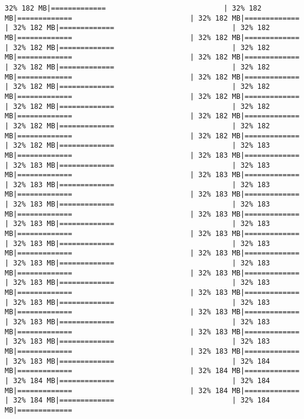 \documentclass[
]{article}
\begin{document}
\begin{verbatim}
32% 182 MB|=============                            | 32% 182 MB|=============                            | 32% 182 MB|=============                            | 32% 182 MB|=============                            | 32% 182 MB|=============                            | 32% 182 MB|=============                            | 32% 182 MB|=============                            | 32% 182 MB|=============                            | 32% 182 MB|=============                            | 32% 182 MB|=============                            | 32% 182 MB|=============                            | 32% 182 MB|=============                            | 32% 182 MB|=============                            | 32% 182 MB|=============                            | 32% 182 MB|=============                            | 32% 182 MB|=============                            | 32% 182 MB|=============                            | 32% 182 MB|=============                            | 32% 182 MB|=============                            | 32% 182 MB|=============                            | 32% 182 MB|=============                            | 32% 182 MB|=============                            | 32% 183 MB|=============                            | 32% 183 MB|=============                            | 32% 183 MB|=============                            | 32% 183 MB|=============                            | 32% 183 MB|=============                            | 32% 183 MB|=============                            | 32% 183 MB|=============                            | 32% 183 MB|=============                            | 32% 183 MB|=============                            | 32% 183 MB|=============                            | 32% 183 MB|=============                            | 32% 183 MB|=============                            | 32% 183 MB|=============                            | 32% 183 MB|=============                            | 32% 183 MB|=============                            | 32% 183 MB|=============                            | 32% 183 MB|=============                            | 32% 183 MB|=============                            | 32% 183 MB|=============                            | 32% 183 MB|=============                            | 32% 183 MB|=============                            | 32% 183 MB|=============                            | 32% 183 MB|=============                            | 32% 183 MB|=============                            | 32% 183 MB|=============                            | 32% 183 MB|=============                            | 32% 183 MB|=============                            | 32% 183 MB|=============                            | 32% 183 MB|=============                            | 32% 183 MB|=============                            | 32% 183 MB|=============                            | 32% 183 MB|=============                            | 32% 183 MB|=============                            | 32% 184 MB|=============                            | 32% 184 MB|=============                            | 32% 184 MB|=============                            | 32% 184 MB|=============                            | 32% 184 MB|=============                            | 32% 184 MB|=============                            | 32% 184 MB|============= 
\end{verbatim}
\end{document}

